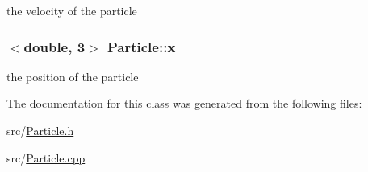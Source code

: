 the velocity of the particle \hypertarget{classParticle_a3789900d6fe19a75d3a82cd5e9622c4c}{
\subsubsection[{x}]{$<$double, 3$>$ Particle\+::x\hspace{0.3cm}{\ttfamily [private]}}}\label{classParticle_a3789900d6fe19a75d3a82cd5e9622c4c}
the position of the particle 

The documentation for this class was generated from the following files\+:\begin{DoxyCompactItemize}
\item 
src/\hyperlink{Particle_8h}{Particle.\+h}\item 
src/\hyperlink{Particle_8cpp}{Particle.\+cpp}\end{DoxyCompactItemize}

